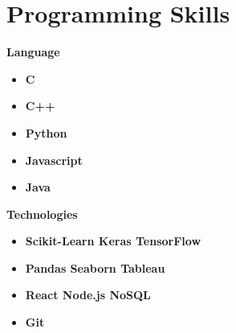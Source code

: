 \documentclass[letterpaper,11pt]{article}
\newcommand{\resumeItem}[2]{
  \item\small{
    \textbf{#1}{ #2 \vspace{-2pt}}
  }
}
\newcommand{\resumeSubHeadingListStart}{\begin{itemize}[leftmargin=*]}
\newcommand{\resumeSubHeadingListEnd}{\end{itemize}}
\newcommand{\resumeItemListStart}{\begin{itemize}}
\newcommand{\resumeItemListEnd}{\end{itemize}\vspace{-5pt}}
\begin{document}
\section{Programming Skills}
%  			 
%
\begin{table}[ht]
	\begin{minipage}[t]{0.45\linewidth}\centering
		  		\textbf{Language}{
		  			\resumeItemListStart
		  			\resumeItem{\firabook C}{}
		  			\resumeItem{\firabook C++}{}
		  			\resumeItem{\firabook Python}{}
		  			\resumeItem{\firabook Javascript}{}
		  			\resumeItem{\firabook Java}{}
		  			\resumeItemListEnd
		  		}

	\end{minipage}
	\hspace{0.5cm}
	\begin{minipage}[t]{0.45\linewidth}
		\centering
			\textbf{Technologies}{
				\resumeItemListStart
				\resumeItem{\firabook Scikit-Learn \textbar Keras \textbar TensorFlow}{}
				\resumeItem{\firabook Pandas \textbar Seaborn \textbar Tableau}{}
				\resumeItem{\firabook React \textbar Node.js \textbar NoSQL}{}
				\resumeItem{\firabook Git}{}
				
				\resumeItemListEnd
			}
	\end{minipage}
\end{table}
\end{document}
